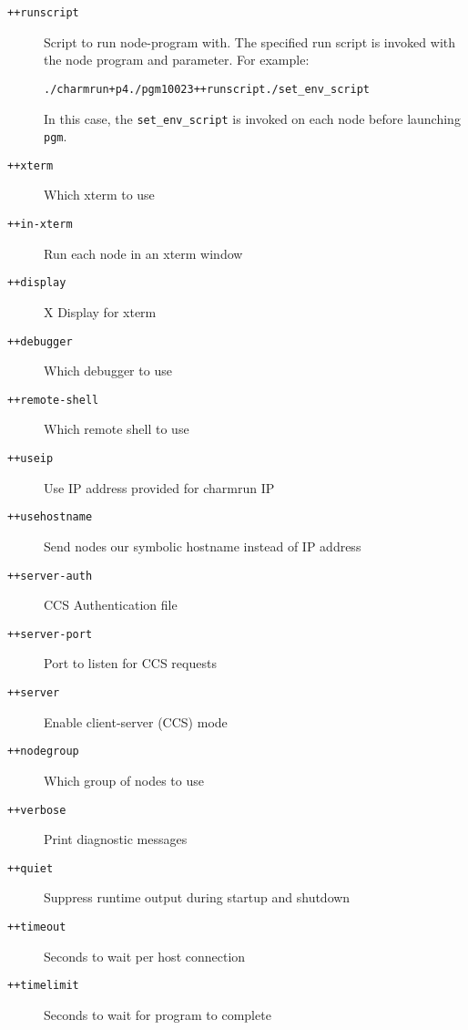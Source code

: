 \begin{description}
\item[{\tt ++runscript}]        Script to run node-program with. The specified run script is invoked with the node program and parameter. For example:

\begin{alltt}
./charmrun +p4 ./pgm 100 2 3 ++runscript ./set\_env\_script
\end{alltt}

In this case, the {\tt set\_env\_script} is invoked on each node before launching {\tt pgm}.

\item[{\tt ++xterm}]            Which xterm to use

\item[{\tt ++in-xterm}]         Run each node in an xterm window

\item[{\tt ++display}]          X Display for xterm

\item[{\tt ++debugger}]         Which debugger to use

\item[{\tt ++remote-shell}]     Which remote shell to use

\item[{\tt ++useip}]            Use IP address provided for charmrun IP

\item[{\tt ++usehostname}]      Send nodes our symbolic hostname instead of IP address



\item[{\tt ++server-auth}]      CCS Authentication file

\item[{\tt ++server-port}]      Port to listen for CCS requests

\item[{\tt ++server}]           Enable client-server (CCS) mode

\item[{\tt ++nodegroup}]        Which group of nodes to use

\item[{\tt ++verbose}]          Print diagnostic messages

\item[{\tt ++quiet}]            Suppress runtime output during startup and shutdown

\item[{\tt ++timeout}]          Seconds to wait per host connection

\item[{\tt ++timelimit}]        Seconds to wait for program to complete

\end{description}

